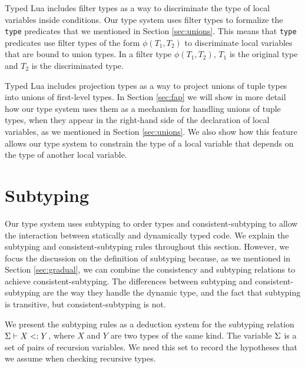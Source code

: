 Typed Lua includes filter types as a way to discriminate the type of local
variables inside conditions.
Our type system uses filter types to formalize the \texttt{type} predicates
that we mentioned in Section \ref{sec:unions}.
This means that \texttt{type} predicates use filter types of the form
$\phi(T_{1},T_{2})$ to discriminate local variables that are bound to
union types.
In a filter type $\phi(T_{1},T_{2})$, $T_{1}$ is the original type and
$T_{2}$ is the discriminated type.

Typed Lua includes projection types as a way to project
unions of tuple types into unions of first-level types.
In Section \ref{sec:fap} we will show in more detail how our type system
uses them as a mechanism for handling unions of tuple types,
when they appear in the right-hand side of the declaration of local variables,
as we mentioned in Section \ref{sec:unions}.
We also show how this feature allows our type system to constrain
the type of a local variable that depends on the type of another local variable.

\section{Subtyping}
\label{sec:subtyping}

Our type system uses subtyping \cite{cardelli1984smi,abadi1996to} to order
types and consistent-subtyping \cite{siek2007objects,siek2013mutable}
to allow the interaction between statically and dynamically typed code.
We explain the subtyping and consistent-subtyping rules throughout this section.
However, we focus the discussion on the definition of subtyping because,
as we mentioned in Section \ref{sec:gradual}, we can combine the
consistency and subtyping relations to achieve consistent-subtyping.
The differences between subtyping and consistent-subtyping are the way
they handle the dynamic type, and the fact that subtyping is transitive,
but consistent-subtyping is not.

We present the subtyping rules as a deduction system for the
subtyping relation $\Sigma \vdash X <: Y$, where $X$ and $Y$
are two types of the same kind.
The variable $\Sigma$ is a set of pairs of recursion variables.
We need this set to record the hypotheses that we assume when checking
recursive types.


